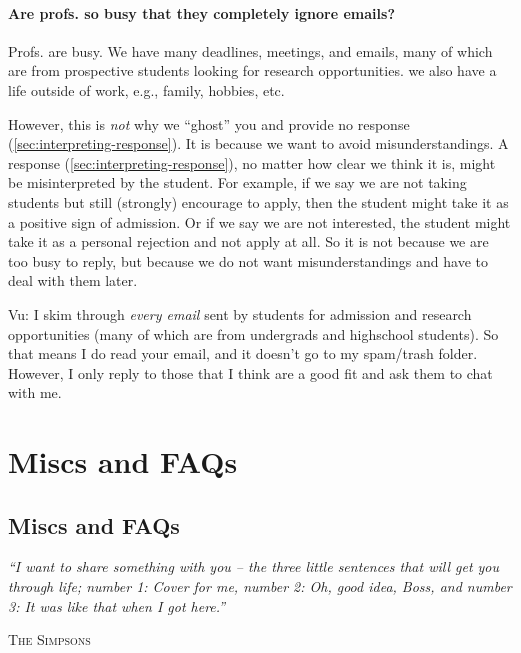 \documentclass[oneside,11pt,dvipsnames]{book}
\newcommand{\myepigraphsimpsons}[1]{
\epigraph{\vspace{-0.2in} \emph{#1}}{\textsc{The Simpsons}}
}
\newenvironment{commentbox}[1][]{
  \small
  \begin{mybox}
    {\small \textbf{#1}}
  }{
  \end{mybox}
}
\begin{document}
\subsection{Are profs. so busy that they completely ignore emails?}\label{sec:busy}

Profs. are busy. We have many deadlines, meetings, and emails, many of which are from prospective students looking for research opportunities. we also have a life outside of work, e.g., family, hobbies, etc. 

However, this is \emph{not} why we ``ghost'' you and provide no response (\autoref{sec:interpreting-response}).  It is because we want to avoid misunderstandings.  A response (\autoref{sec:interpreting-response}), no matter how clear we think it is, might be misinterpreted by the student.  For example, if we say we are not taking students but still (strongly) encourage to apply, then the student might take it as a positive sign of admission. Or if we say we are not interested, the student might take it as a personal rejection and not apply at all.  So it is not because we are too busy to reply, but because we do not want misunderstandings and have to deal with them later. 




\begin{commentbox}{Vu: }
    I skim through \emph{every email} sent by students for admission and research opportunities (many of which are from undergrads and highschool students). So that means I do read your email, and it doesn't go to my spam/trash folder. 
    However, I only reply to those that I think are a good fit and ask them to chat with me.
    \end{commentbox}
    

\part{Miscs and FAQs}\label{part:faqs}
\chapter{Miscs and FAQs}\label{sec:faqs}

\myepigraphsimpsons{``I want to share something with you – the three little sentences that will get you through life; number 1: Cover for me, number 2: Oh, good idea, Boss, and number 3: It was like that when I got here.''}

\end{document}

